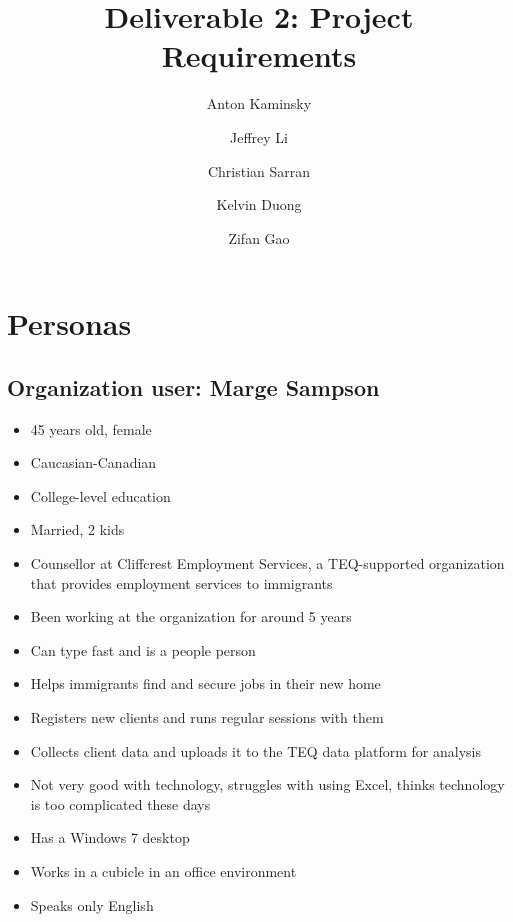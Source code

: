 \documentclass[]{scrartcl}
\title{Deliverable 2: Project Requirements}
\author{Anton Kaminsky \and Jeffrey Li \and Christian Sarran \and Kelvin Duong \and Zifan Gao}
\begin{document}
\maketitle
\section{Personas}
\subsection{Organization user: Marge Sampson}
\begin{itemize}
	\item 45 years old, female
	\item Caucasian-Canadian
	\item College-level education
	\item Married, 2 kids
	\item Counsellor at Cliffcrest Employment Services, a TEQ-supported organization that provides employment services to immigrants
	\item Been working at the organization for around 5 years
	\item Can type fast and is a people person
	\item Helps immigrants find and secure jobs in their new home
	\item Registers new clients and runs regular sessions with them
	\item Collects client data and uploads it to the TEQ data platform for analysis
	\item Not very good with technology, struggles with using Excel, thinks technology is too complicated these days
	\item Has a Windows 7 desktop
	\item Works in a cubicle in an office environment
	\item Speaks only English
\end{itemize}
\end{document}

